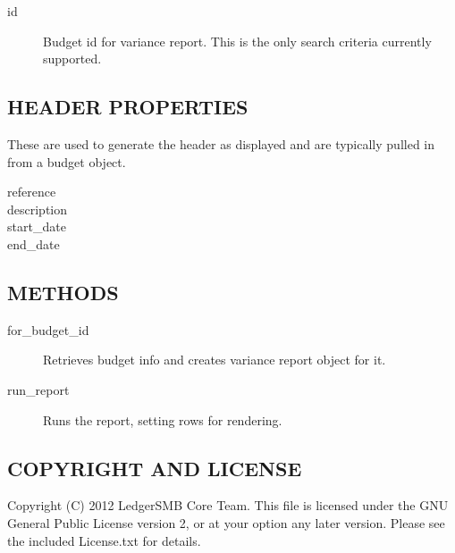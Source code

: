 \begin{description}
\begin{description}
\begin{description}
\begin{description}
\begin{description}
\begin{description}
\begin{description}
\begin{description}
\begin{description}
\begin{description}
\begin{description}
\item[{id}] \mbox{}

Budget id for variance report.  This is the only search criteria currently 
supported.

\end{description}
\subsection*{HEADER PROPERTIES\label{LedgerSMB::DBObject::Report::Budget::Variance_HEADER_PROPERTIES}}


These are used to generate the header as displayed and are typically pulled in 
from a budget object.

\begin{description}

\item[{reference}] \mbox{}
\item[{description}] \mbox{}
\item[{start\_date}] \mbox{}
\item[{end\_date}] \mbox{}\end{description}
\subsection*{METHODS\label{LedgerSMB::DBObject::Report::Budget::Variance_METHODS}}
\begin{description}

\item[{for\_budget\_id}] \mbox{}

Retrieves budget info and creates variance report object for it.


\item[{run\_report}] \mbox{}

Runs the report, setting rows for rendering.

\end{description}
\subsection*{COPYRIGHT AND LICENSE\label{LedgerSMB::DBObject::Report::Budget::Variance_COPYRIGHT_AND_LICENSE}}


Copyright (C) 2012 LedgerSMB Core Team.  This file is licensed under the GNU 
General Public License version 2, or at your option any later version.  Please
see the included License.txt for details.


\end{description}
\end{description}
\end{description}
\end{description}
\end{description}
\end{description}
\end{description}
\end{description}
\end{description}
\end{description}

